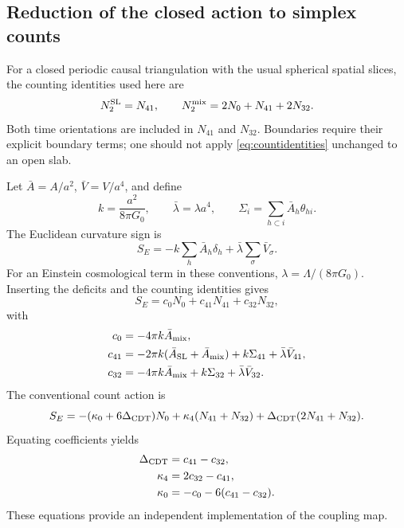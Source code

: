 \subsection{Reduction of the closed action to simplex counts}

For a closed periodic causal triangulation with the usual spherical spatial slices, the counting identities used here are
\begin{equation}
N_2^{\rm SL}=N_{41},\qquad
N_2^{\rm mix}=2N_0+N_{41}+2N_{32}.
\label{eq:countidentities}
\end{equation}
Both time orientations are included in $N_{41}$ and $N_{32}$. Boundaries require their explicit boundary terms; one should not apply \eqref{eq:countidentities} unchanged to an open slab.

Let $\bar A=A/a^2$, $\bar V=V/a^4$, and define
\begin{equation}
k=\frac{a^2}{8\pi G_0},\qquad
\bar\lambda=\lambda a^4,\qquad
\Sigma_i=\sum_{h\subset i}\bar A_h\theta_{hi}.
\end{equation}
The Euclidean curvature sign is
\begin{equation}
S_E=-k\sum_h\bar A_h\delta_h
+\bar\lambda\sum_\sigma\bar V_\sigma.
\end{equation}
For an Einstein cosmological term in these conventions,
$\lambda=\Lambda/(8\pi G_0)$. Inserting the deficits and the counting identities gives
\begin{equation}
S_E=c_0N_0+c_{41}N_{41}+c_{32}N_{32},
\end{equation}
with
\begin{align}
c_0&=-4\pi k\bar A_{\rm mix},\\
c_{41}&=-2\pi k(\bar A_{\rm SL}+\bar A_{\rm mix})
+k\Sigma_{41}+\bar\lambda\bar V_{41},\\
c_{32}&=-4\pi k\bar A_{\rm mix}
+k\Sigma_{32}+\bar\lambda\bar V_{32}.
\end{align}
The conventional count action is
\begin{equation}
S_E=-(\kappa_0+6\Delta_{\rm CDT})N_0
+\kappa_4(N_{41}+N_{32})
+\Delta_{\rm CDT}(2N_{41}+N_{32}).
\end{equation}
Equating coefficients yields
\begin{align}
\Delta_{\rm CDT}&=c_{41}-c_{32},\\
\kappa_4&=2c_{32}-c_{41},\\
\kappa_0&=-c_0-6(c_{41}-c_{32}).
\label{eq:couplingmap}
\end{align}
These equations provide an independent implementation of the coupling map.

